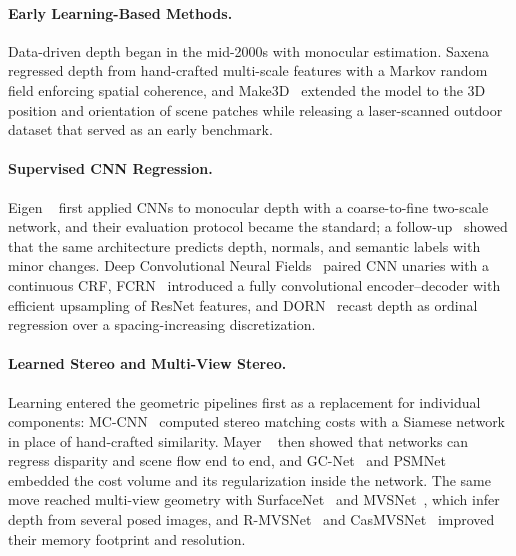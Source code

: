 \paragraph{Early Learning-Based Methods.}
Data-driven depth began in the mid-2000s with monocular estimation. Saxena \etal~\cite{saxena2005learning} regressed depth from hand-crafted multi-scale features with a Markov random field enforcing spatial coherence, and Make3D~\cite{saxena2008make3d} extended the model to the 3D position and orientation of scene patches while releasing a laser-scanned outdoor dataset that served as an early benchmark.

\paragraph{Supervised CNN Regression.}
Eigen \etal~\cite{eigen2014depth} first applied CNNs to monocular depth with a coarse-to-fine two-scale network, and their evaluation protocol became the standard; a follow-up~\cite{eigen2015predicting} showed that the same architecture predicts depth, normals, and semantic labels with minor changes. Deep Convolutional Neural Fields~\cite{liu2015deep} paired CNN unaries with a continuous CRF, FCRN~\cite{laina2016deeper} introduced a fully convolutional encoder--decoder with efficient upsampling of ResNet features, and DORN~\cite{fu2018deep} recast depth as ordinal regression over a spacing-increasing discretization.

\paragraph{Learned Stereo and Multi-View Stereo.}
Learning entered the geometric pipelines first as a replacement for individual components: MC-CNN~\cite{zbontar2015computing} computed stereo matching costs with a Siamese network in place of hand-crafted similarity. Mayer \etal~\cite{mayer2016large} then showed that networks can regress disparity and scene flow end to end, and GC-Net~\cite{kendall2017end} and PSMNet~\cite{chang2018pyramid} embedded the cost volume and its regularization inside the network. The same move reached multi-view geometry with SurfaceNet~\cite{ji2017surfacenet} and MVSNet~\cite{yao2018mvsnet}, which infer depth from several posed images, and R-MVSNet~\cite{yao2019recurrent} and CasMVSNet~\cite{gu2020cascade} improved their memory footprint and resolution.

